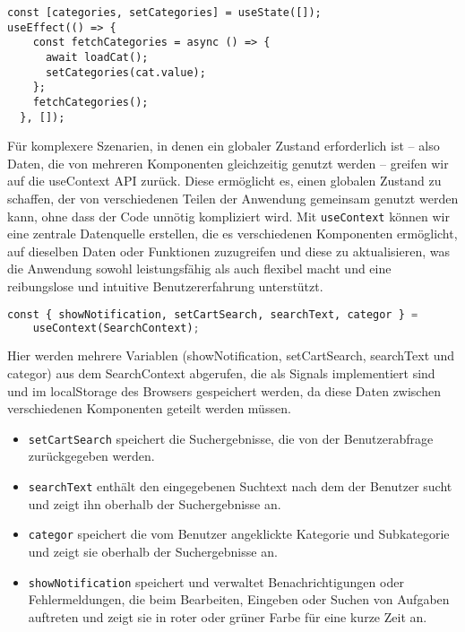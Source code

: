 \begin{lstlisting}
const [categories, setCategories] = useState([]);
useEffect(() => {
    const fetchCategories = async () => {
      await loadCat();
      setCategories(cat.value);
    };
    fetchCategories();
  }, []);

\end{lstlisting}


Für komplexere Szenarien, in denen ein globaler Zustand erforderlich ist – also Daten, die von mehreren Komponenten gleichzeitig genutzt werden – greifen wir auf die useContext API zurück. Diese ermöglicht es, einen globalen Zustand zu schaffen, der von verschiedenen Teilen der Anwendung gemeinsam genutzt werden kann, ohne dass der Code unnötig kompliziert wird. Mit \texttt{useContext} können wir eine zentrale Datenquelle erstellen, die es verschiedenen Komponenten ermöglicht, auf dieselben Daten oder Funktionen zuzugreifen und diese zu aktualisieren, was die Anwendung sowohl leistungsfähig als auch flexibel macht und eine reibungslose und intuitive Benutzererfahrung unterstützt.


\begin{lstlisting}[language=Python]
  const { showNotification, setCartSearch, searchText, categor } =
    useContext(SearchContext);
 \end{lstlisting}  
 
Hier werden mehrere Variablen (showNotification, setCartSearch, searchText und categor) aus dem SearchContext abgerufen, die als Signals implementiert sind und im localStorage des Browsers gespeichert werden, da diese Daten zwischen verschiedenen Komponenten geteilt werden müssen.

\begin{itemize}
    \item \texttt{setCartSearch} speichert die Suchergebnisse, die von der Benutzerabfrage zurückgegeben werden.
    \item \texttt{searchText} enthält den eingegebenen Suchtext nach dem der Benutzer sucht und zeigt ihn oberhalb der Suchergebnisse an.
    \item \texttt{categor} speichert die vom Benutzer angeklickte Kategorie und Subkategorie und zeigt sie oberhalb der Suchergebnisse an.
    \item \texttt{showNotification} speichert und verwaltet Benachrichtigungen oder Fehlermeldungen, die beim Bearbeiten, Eingeben oder Suchen von Aufgaben auftreten und zeigt sie in roter oder grüner Farbe für eine kurze Zeit an. 
\end{itemize}


